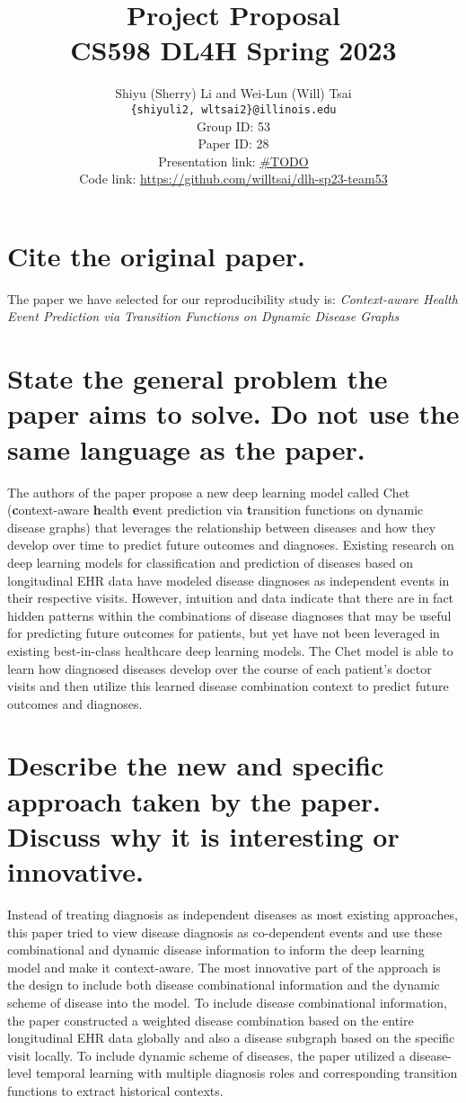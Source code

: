 \documentclass[11pt,a4paper]{article}
\title{
  Project Proposal \\
  CS598 DL4H Spring 2023
  }
\author{Shiyu (Sherry) Li and Wei-Lun (Will) Tsai \\
  \texttt{\{shiyuli2, wltsai2\}@illinois.edu}
  \\[2em]
  Group ID: 53\\
  Paper ID: 28\\
  Presentation link: \url{\#TODO} \\
  Code link: \url{https://github.com/willtsai/dlh-sp23-team53}}
\begin{document}
\maketitle


\section{Cite the original paper.}
The paper we have selected for our reproducibility study is: 
\textit{Context-aware Health Event Prediction via Transition 
Functions on Dynamic Disease Graphs} \cite{chet}

\section{State the general problem the paper aims to solve. Do not
use the same language as the paper.}
The authors of the paper propose a new deep learning model called Chet
(\textbf{c}ontext-aware \textbf{h}ealth \textbf{e}vent prediction via
\textbf{t}ransition functions on dynamic disease graphs) that leverages the
relationship between diseases and how they develop over time to predict future
outcomes and diagnoses. Existing research on deep learning models for
classification and prediction of diseases based on longitudinal EHR data have
modeled disease diagnoses as independent events in their respective visits.
However, intuition and data indicate that there are in fact hidden patterns
within the combinations of disease diagnoses that may be useful for predicting
future outcomes for patients, but yet have not been leveraged in existing
best-in-class healthcare deep learning models. The Chet model is able to learn
how diagnosed diseases develop over the course of each patient's doctor visits
and then utilize this learned disease combination context to predict future
outcomes and diagnoses. 

\section{Describe the new and specific approach taken by the
paper. Discuss why it is interesting or innovative.}
Instead of treating diagnosis as independent diseases as most existing approaches,
this paper tried to view disease diagnosis as co-dependent events and use these
combinational and dynamic disease information to inform the deep learning model and make it  
context-aware. The most innovative part of the approach is the design to include both
disease combinational information and the dynamic scheme of disease into the model. To include 
disease combinational information, the paper constructed a weighted disease combination
based on the entire longitudinal EHR data globally and also a disease subgraph based on the 
specific visit locally. To include dynamic scheme of diseases, the paper utilized a disease-level
temporal learning with multiple diagnosis roles and corresponding transition functions to extract
historical contexts.
\end{document}
